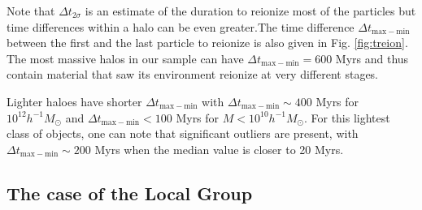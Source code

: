 \documentclass[twocolumn]{aastex61}
\begin{document}
Note that $\Delta t_{2\sigma}$ is an estimate of the duration to reionize most of the particles but time differences within a halo can be even greater.The time difference $\Delta t_\mathrm{max-min}$ between the first and the last particle to reionize is also given in Fig. \ref{fig:treion}. The most massive halos in our sample can have $\Delta t_\mathrm{max-min}=600$ Myrs and thus contain material that saw its environment reionize at very different stages.%

Lighter haloes have shorter $\Delta t_\mathrm{max-min}$ with $\Delta t_\mathrm{max-min}\sim 400$ Myrs for $10^{12} h^{-1}M_\odot$ and $\Delta t_\mathrm{max-min}< 100$ Myrs for $M<10^{10} h^{-1} M_\odot$. For this lightest class of objects, one can note that significant outliers are present, with $\Delta t_\mathrm{max-min}\sim 200$ Myrs when the median value is closer to 20 Myrs.


\subsection{The case of the Local Group}
\end{document}
